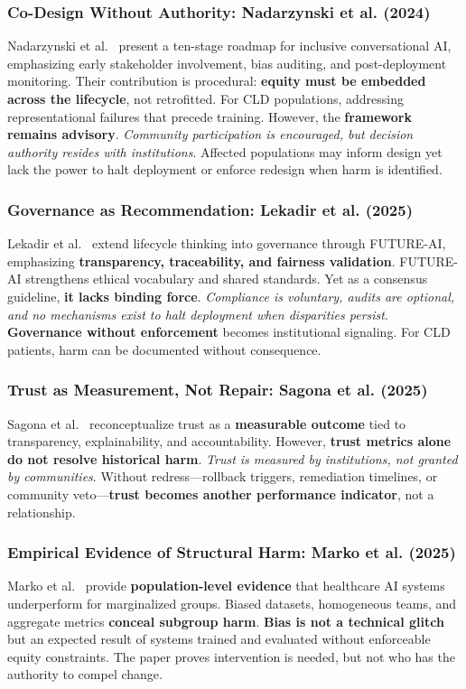 \documentclass[12pt,a4paper]{article}
\begin{document}
\subsubsection{Co-Design Without Authority: Nadarzynski et al. (2024)}
Nadarzynski et al.\ \citep{Nadarzynski2024} present a ten-stage roadmap for inclusive conversational AI, emphasizing early stakeholder involvement, bias auditing, and post-deployment monitoring. Their contribution is procedural: \textbf{equity must be embedded across the lifecycle}, not retrofitted. For CLD populations, addressing representational failures that precede training. However, the \textbf{framework remains advisory}. \textit{Community participation is encouraged, but decision authority resides with institutions}. Affected populations may inform design yet lack the power to halt deployment or enforce redesign when harm is identified.

\subsubsection{Governance as Recommendation: Lekadir et al. (2025)}
Lekadir et al.\ \citep{Lekadir2025} extend lifecycle thinking into governance through FUTURE-AI, emphasizing \textbf{transparency, traceability, and fairness validation}. FUTURE-AI strengthens ethical vocabulary and shared standards. Yet as a consensus guideline, \textbf{it lacks binding force}. \textit{Compliance is voluntary, audits are optional, and no mechanisms exist to halt deployment when disparities persist}. \textbf{Governance without enforcement} becomes institutional signaling. For CLD patients, harm can be documented without consequence.

\subsubsection{Trust as Measurement, Not Repair: Sagona et al. (2025)}
Sagona et al.\ \citep{Sagona2025} reconceptualize trust as a \textbf{measurable outcome} tied to transparency, explainability, and accountability. However, \textbf{trust metrics alone do not resolve historical harm}. \textit{Trust is measured by institutions, not granted by communities}. Without redress—rollback triggers, remediation timelines, or community veto—\textbf{trust becomes another performance indicator}, not a relationship.

\subsubsection{Empirical Evidence of Structural Harm: Marko et al. (2025)}
Marko et al.\ \citep{Marko2025} provide \textbf{population-level evidence} that healthcare AI systems underperform for marginalized groups. Biased datasets, homogeneous teams, and aggregate metrics \textbf{conceal subgroup harm}. \textbf{Bias is not a technical glitch} but an expected result of systems trained and evaluated without enforceable equity constraints. The paper proves intervention is needed, but not who has the authority to compel change.
\end{document}
